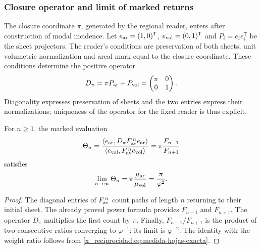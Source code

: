 \subsubsection{Closure operator and limit of marked returns}
\label{x_reciprocidad:sec:operador-retorno-marcado}

The closure coordinate \(\pi\), generated by the regional reader,
enters after construction of modal incidence. Let
\(e_{\rm ar}=(1,0)^{\mathsf T}\),
\(e_{\rm vol}=(0,1)^{\mathsf T}\) and
\(P_i=e_ie_i^{\mathsf T}\) be the sheet projectors. The reader's conditions
are preservation of both sheets, unit volumetric normalization
and areal mark equal to the closure coordinate. These conditions
determine the positive operator
\begin{equation}
 D_\pi=\pi P_{\rm ar}+P_{\rm vol}
       =\begin{pmatrix}\pi&0\\0&1\end{pmatrix}.
 \label{x_reciprocidad:eq:operador-marca-pi}
\end{equation}
Diagonality expresses preservation of sheets and the two entries
express their normalizations; uniqueness of the operator
for the fixed reader is thus explicit.

\begin{proposition}
For \(n\geq1\), the marked evaluation
\begin{equation}
 \Theta_n=
 \frac{\langle e_{\rm ar},D_\pi F_{\rm av}^{\,n}e_{\rm ar}\rangle}
 {\langle e_{\rm vol},F_{\rm av}^{\,n}e_{\rm vol}\rangle}
 =\pi\frac{F_{n-1}}{F_{n+1}}
 \label{x_reciprocidad:eq:retorno-marcado-finito}
\end{equation}
satisfies
\begin{equation}
 \lim_{n\to\infty}\Theta_n
 =\pi\frac{\mu_{\rm ar}}{\mu_{\rm vol}}
 =\frac{\pi}{\varphi^2}.
 \label{x_reciprocidad:eq:retorno-marcado-limite}
\end{equation}
\end{proposition}
\begin{proof}
The diagonal entries of \(F_{\rm av}^{\,n}\) count paths
of length \(n\) returning to their initial sheet. The already proved power
formula provides \(F_{n-1}\) and \(F_{n+1}\). The operator
\(D_\pi\) multiplies the first count by \(\pi\). Finally,
\(F_{n-1}/F_{n+1}\) is the product of two consecutive ratios
converging to \(\varphi^{-1}\); its limit is
\(\varphi^{-2}\). The identity with the weight ratio follows from
\eqref{x_reciprocidad:eq:medida-hojas-exacta}.
\end{proof}

